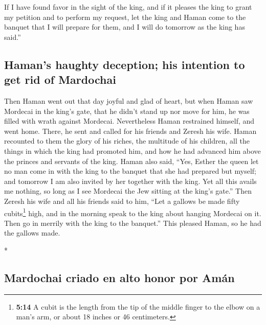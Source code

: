 \begin{paracol}{2}
\begin{otherlanguage}{english}
 If I have found favor in the sight of the king, and if it
pleases the king to grant my petition and to perform my request, let the
king and Haman come to the banquet that I will prepare for them, and I
will do tomorrow as the king has said.''

\hypertarget{hamans-haughty-deception-his-intention-to-get-rid-of-mardochai}{%
\subsection{Haman's haughty deception; his intention to get rid of
Mardochai}\label{hamans-haughty-deception-his-intention-to-get-rid-of-mardochai}}

 Then Haman went out that day joyful and glad of heart,
but when Haman saw Mordecai in the king's gate, that he didn't stand up
nor move for him, he was filled with wrath against Mordecai.
 Nevertheless Haman restrained himself, and went home.
There, he sent and called for his friends and Zeresh his wife.
 Haman recounted to them the glory of his riches, the
multitude of his children, all the things in which the king had promoted
him, and how he had advanced him above the princes and servants of the
king.  Haman also said, ``Yes, Esther the queen let no
man come in with the king to the banquet that she had prepared but
myself; and tomorrow I am also invited by her together with the king.
 Yet all this avails me nothing, so long as I see
Mordecai the Jew sitting at the king's gate.''  Then
Zeresh his wife and all his friends said to him, ``Let a gallows be made
fifty cubits\footnote{\textbf{5:14} A cubit is the length from the tip
  of the middle finger to the elbow on a man's arm, or about 18 inches
  or 46 centimeters.} high, and in the morning speak to the king about
hanging Mordecai on it. Then go in merrily with the king to the
banquet.'' This pleased Haman, so he had the gallows made.

\end{otherlanguage}

\switchcolumn[0]*

\hypertarget{mardochai-criado-en-alto-honor-por-amuxe1n}{%
\subsection{Mardochai criado en alto honor por
Amán}\label{mardochai-criado-en-alto-honor-por-amuxe1n}}

\hypertarget{section-10}{%
}
\end{paracol}

